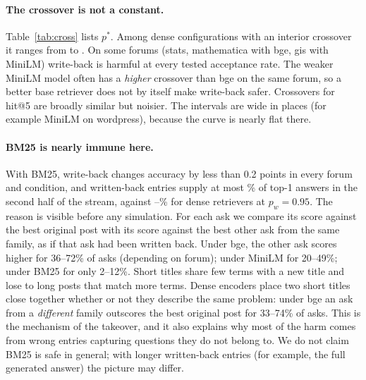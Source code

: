 \documentclass[11pt]{article}
\begin{document}
\begin{table}[t]\centering\scriptsize

\caption{No-write-back accuracy (\%) and the crossover acceptance rate $p^*$ for naive write-back, with 95\% bootstrap intervals over ten orders. The last column is the plug-in prediction of Section~\ref{sec:model}, calibrated from the runs at $p_w=0.3$ only. ``--'': no entry ever changed an answer.}
\label{tab:cross}
\end{table}

\paragraph{The crossover is not a constant.} Table~\ref{tab:cross} lists $p^*$. Among dense configurations with an interior crossover it ranges from \crossMin{} to \crossMax{}. On some forums (stats, mathematica with bge, gis with MiniLM) write-back is harmful at every tested acceptance rate. The weaker MiniLM model often has a \emph{higher} crossover than bge on the same forum, so a better base retriever does not by itself make write-back safer. Crossovers for hit@5 are broadly similar but noisier. The intervals are wide in places (for example MiniLM on wordpress), because the curve is nearly flat there.

\paragraph{BM25 is nearly immune here.} With BM25, write-back changes accuracy by less than 0.2 points in every forum and condition, and written-back entries supply at most \ssBmMax\% of top-1 answers in the second half of the stream, against \ssMin--\ssMax\% for dense retrievers at $p_w=0.95$. The reason is visible before any simulation. For each ask we compare its score against the best original post with its score against the best other ask from the same family, as if that ask had been written back. Under bge, the other ask scores higher for 36--72\% of asks (depending on forum); under MiniLM for 20--49\%; under BM25 for only 2--12\%. Short titles share few terms with a new title and lose to long posts that match more terms. Dense encoders place two short titles close together whether or not they describe the same problem: under bge an ask from a \emph{different} family outscores the best original post for 33--74\% of asks. This is the mechanism of the takeover, and it also explains why most of the harm comes from wrong entries capturing questions they do not belong to. We do not claim BM25 is safe in general; with longer written-back entries (for example, the full generated answer) the picture may differ.
\end{document}

